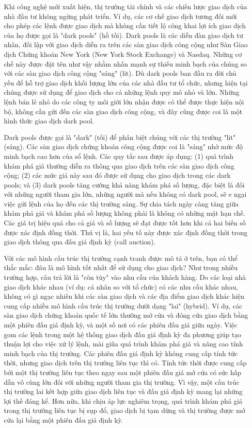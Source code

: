 Khi công nghệ mới xuất hiện, thị trường tài chính và các chiến lược giao dịch của nhà đầu tư không ngừng phát triển. Ví dụ, các cơ chế giao dịch tương đối mới cho phép các lệnh được giao dịch mà không cần tiết lộ công khai lợi ích giao dịch của họ được gọi là "dark pools" (hồ tối). Dark pools là các diễn đàn giao dịch tư nhân, đối lập với giao dịch diễn ra trên các sàn giao dịch công cộng như Sàn Giao dịch Chứng khoán New York (New York Stock Exchange) và Nasdaq. Những cơ chế này được đặt tên như vậy nhằm nhấn mạnh sự thiếu minh bạch của chúng so với các sàn giao dịch công cộng "sáng" (lit). Dù dark pools ban đầu ra đời chủ yếu để hỗ trợ giao dịch khối lượng lớn của các nhà đầu tư tổ chức, nhưng hiện tại chúng được sử dụng để giao dịch cho cả những lệnh quy mô nhỏ và lớn. Những lệnh bán lẻ nhỏ do các công ty môi giới lớn nhận được có thể được thực hiện nội bộ, không cần gửi đến các sàn giao dịch công cộng, và đây cũng được coi là một hình thức giao dịch dark pool.

Dark pools được gọi là "dark" (tối) để phân biệt chúng với các thị trường "lit" (sáng). Các sàn giao dịch chứng khoán công cộng được coi là "sáng" nhờ mức độ minh bạch cao hơn của sổ lệnh. Các quy tắc sau được áp dụng: (1) quá trình khám phá giá thường diễn ra thông qua giao dịch trên các sàn giao dịch công cộng; (2) các mức giá này sau đó được sử dụng cho giao dịch trong các dark pools; và (3) dark pools tăng cường khả năng khám phá số lượng, đặc biệt là đối với những người tham gia lớn, những người mà nếu không có dark pool, sẽ e ngại việc gửi lệnh của họ đến các thị trường sáng. Sự chia tách ngày càng tăng giữa khám phá giá và khám phá số lượng không phải là không có những mặt hạn chế. Các giá trị hiệu quả cho cả giá và số lượng sẽ đạt được tốt hơn khi cả hai biến số được xác định đồng thời. Thú vị là, hai yếu tố này được xác định đồng thời trong giao dịch thông qua đấu giá định kỳ (call auction).

Với các mô hình cấu trúc thị trường cạnh tranh được mô tả ở trên, bạn có thể thắc mắc: đâu là mô hình tốt nhất để sử dụng cho giao dịch? Như trong nhiều trường hợp, câu trả lời là "còn tùy" vào nhu cầu của khách hàng. Do các loại nhà giao dịch khác nhau (ví dụ: cá nhân so với tổ chức) có các nhu cầu khác nhau, không có gì ngạc nhiên khi các sàn giao dịch và các địa điểm giao dịch khác hiện cung cấp nhiều mô hình cấu trúc thị trường dưới dạng "lai" (hybrid). Ví dụ, các sàn giao dịch chứng khoán quốc tế lớn thường mở cửa và đóng cửa giao dịch bằng một phiên đấu giá định kỳ, và một số nơi có các phiên đấu giá giữa ngày. Việc gom các lệnh trong một hệ thống giao dịch đấu giá định kỳ đa phương giúp tạo thuận lợi cho việc xử lý lệnh, mài giũa quá trình khám phá giá và nâng cao tính minh bạch của thị trường. Các phiên đấu giá định kỳ không cung cấp tính tức thời, nhưng giao dịch trên thị trường liên tục thì có. Tính tức thời được cung cấp bởi một thị trường liên tục theo ngay sau một phiên đấu giá mở cửa có sức hấp dẫn vô cùng lớn đối với những người tham gia thị trường. Vì vậy, một cấu trúc thị trường lai kết hợp giữa giao dịch liên tục và đấu giá định kỳ mang lại những lợi thế đáng kể. Hơn nữa, khi chịu áp lực nghiêm trọng, quá trình khám phá giá trong thị trường liên tục bị sụp đổ, giao dịch bị tạm dừng và thị trường được mở cửa lại bằng một phiên đấu giá định kỳ.


